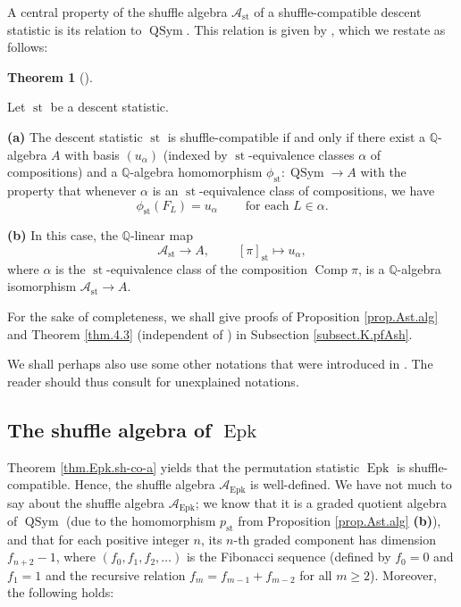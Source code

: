 \documentclass[numbers=enddot,12pt,final,onecolumn,notitlepage]{scrartcl}%
\theoremstyle{definition}
\newtheorem{theo}{Theorem}[section]
\newenvironment{theorem}[1][]
{\begin{theo}[#1]\begin{leftbar}}
{\end{leftbar}\end{theo}}
\begin{document}
A central property of the shuffle algebra $\mathcal{A}_{\operatorname*{st}}$
of a shuffle-compatible descent statistic is its relation to
$\operatorname*{QSym}$. This relation is given by \cite[Theorem 4.3]{part1},
which we restate as follows:

\begin{theorem}
\label{thm.4.3}Let $\operatorname*{st}$ be a descent statistic.

\textbf{(a)} The descent statistic $\operatorname*{st}$ is shuffle-compatible
if and only if there exist a $\mathbb{Q}$-algebra $A$ with basis $\left(
u_{\alpha}\right)  $ (indexed by $\operatorname*{st}$-equivalence classes
$\alpha$ of compositions) and a $\mathbb{Q}$-algebra homomorphism
$\phi_{\operatorname*{st}}:\operatorname*{QSym}\rightarrow A$ with the
property that whenever $\alpha$ is an $\operatorname*{st}$-equivalence class
of compositions, we have%
\[
\phi_{\operatorname*{st}}\left(  F_{L}\right)  =u_{\alpha}%
\ \ \ \ \ \ \ \ \ \ \text{for each }L\in\alpha.
\]


\textbf{(b)} In this case, the $\mathbb{Q}$-linear map%
\[
\mathcal{A}_{\operatorname*{st}}\rightarrow A,\ \ \ \ \ \ \ \ \ \ \left[
\pi\right]  _{\operatorname*{st}}\mapsto u_{\alpha},
\]
where $\alpha$ is the $\operatorname*{st}$-equivalence class of the
composition $\operatorname*{Comp}\pi$, is a $\mathbb{Q}$-algebra isomorphism
$\mathcal{A}_{\operatorname*{st}}\rightarrow A$.
\end{theorem}

For the sake of completeness, we shall give proofs of Proposition
\ref{prop.Ast.alg} and Theorem \ref{thm.4.3} (independent of \cite{part1}) in
Subsection \ref{subsect.K.pfAsh}.

We shall perhaps also use some other notations that were introduced in
\cite{part1}. The reader should thus consult \cite{part1} for unexplained notations.

\subsection{The shuffle algebra of $\operatorname*{Epk}$}

Theorem \ref{thm.Epk.sh-co-a} yields that the permutation statistic
$\operatorname*{Epk}$ is shuffle-compatible. Hence, the shuffle algebra
$\mathcal{A}_{\operatorname*{Epk}}$ is well-defined. We have not much to say
about the shuffle algebra $\mathcal{A}_{\operatorname*{Epk}}$; we know that it
is a graded quotient algebra of $\operatorname*{QSym}$ (due to the
homomorphism $p_{\operatorname*{st}}$ from Proposition \ref{prop.Ast.alg}
\textbf{(b)}), and that for each positive integer $n$, its $n$-th graded
component has dimension $f_{n+2}-1$, where $\left(  f_{0},f_{1},f_{2}%
,\ldots\right)  $ is the Fibonacci sequence (defined by $f_{0}=0$ and
$f_{1}=1$ and the recursive relation $f_{m}=f_{m-1}+f_{m-2}$ for all $m\geq
2$). Moreover, the following holds:
\end{document}
